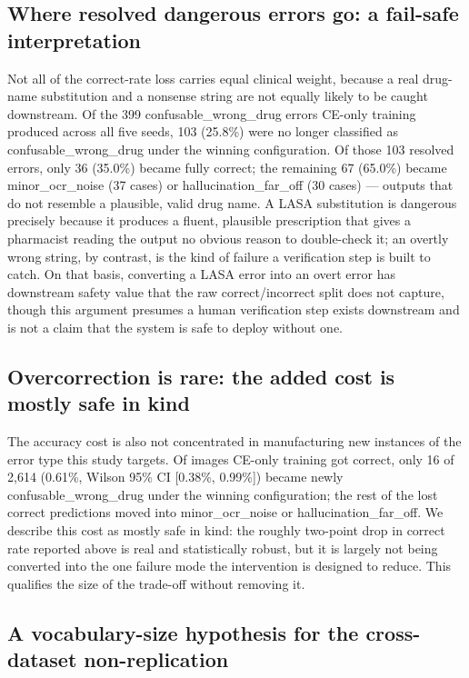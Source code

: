 \documentclass[fleqn,10pt]{wlpeerj}
\begin{document}
\subsection*{Where resolved dangerous errors go: a fail-safe interpretation}\label{sec:disc-failsafe}

Not all of the correct-rate loss carries equal clinical weight, because a real drug-name substitution and a nonsense string are not equally likely to be caught downstream. Of the 399 confusable\_wrong\_drug errors CE-only training produced across all five seeds, 103 (25.8\%) were no longer classified as confusable\_wrong\_drug under the winning configuration. Of those 103 resolved errors, only 36 (35.0\%) became fully correct; the remaining 67 (65.0\%) became minor\_ocr\_noise (37 cases) or hallucination\_far\_off (30 cases) --- outputs that do not resemble a plausible, valid drug name. A LASA substitution is dangerous precisely because it produces a fluent, plausible prescription that gives a pharmacist reading the output no obvious reason to double-check it; an overtly wrong string, by contrast, is the kind of failure a verification step is built to catch. On that basis, converting a LASA error into an overt error has downstream safety value that the raw correct/incorrect split does not capture, though this argument presumes a human verification step exists downstream and is not a claim that the system is safe to deploy without one.

\subsection*{Overcorrection is rare: the added cost is mostly safe in kind}\label{sec:disc-overcorrection}

The accuracy cost is also not concentrated in manufacturing new instances of the error type this study targets. Of images CE-only training got correct, only 16 of 2,614 (0.61\%, Wilson 95\% CI [0.38\%, 0.99\%]) became newly confusable\_wrong\_drug under the winning configuration; the rest of the lost correct predictions moved into minor\_ocr\_noise or hallucination\_far\_off. We describe this cost as mostly safe in kind: the roughly two-point drop in correct rate reported above is real and statistically robust, but it is largely not being converted into the one failure mode the intervention is designed to reduce. This qualifies the size of the trade-off without removing it.

\subsection*{A vocabulary-size hypothesis for the cross-dataset non-replication}\label{sec:disc-vocab}
\end{document}
